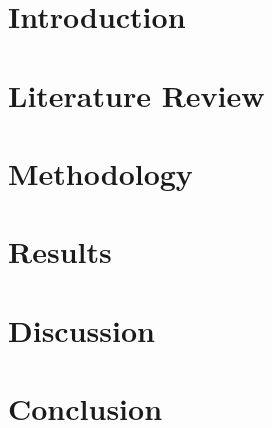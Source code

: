 \documentclass[12pt]{article}
\begin{document}

\begin{abstract}
\end{abstract}

\section{Introduction}

\section{Literature Review}

\section{Methodology}

\section{Results}

\section{Discussion}

\section{Conclusion}

\begin{thebibliography}{9}
\end{thebibliography}
\end{document}
